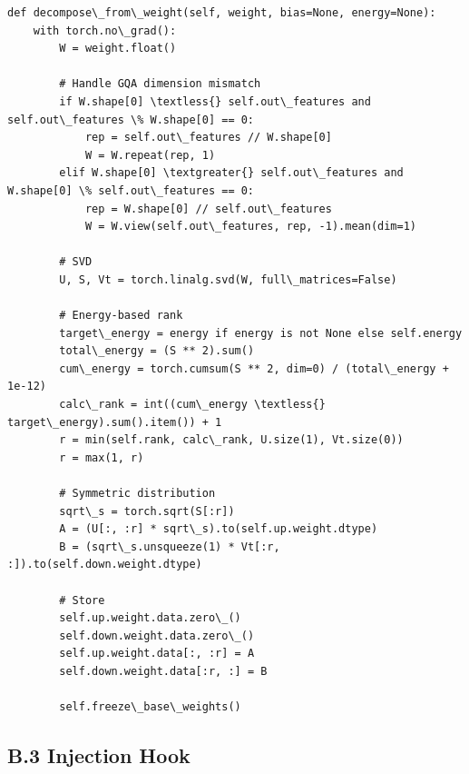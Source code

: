 \begin{lstlisting}
def decompose\_from\_weight(self, weight, bias=None, energy=None):
    with torch.no\_grad():
        W = weight.float()
        
        # Handle GQA dimension mismatch
        if W.shape[0] \textless{} self.out\_features and self.out\_features \% W.shape[0] == 0:
            rep = self.out\_features // W.shape[0]
            W = W.repeat(rep, 1)
        elif W.shape[0] \textgreater{} self.out\_features and W.shape[0] \% self.out\_features == 0:
            rep = W.shape[0] // self.out\_features
            W = W.view(self.out\_features, rep, -1).mean(dim=1)
        
        # SVD
        U, S, Vt = torch.linalg.svd(W, full\_matrices=False)
        
        # Energy-based rank
        target\_energy = energy if energy is not None else self.energy
        total\_energy = (S ** 2).sum()
        cum\_energy = torch.cumsum(S ** 2, dim=0) / (total\_energy + 1e-12)
        calc\_rank = int((cum\_energy \textless{} target\_energy).sum().item()) + 1
        r = min(self.rank, calc\_rank, U.size(1), Vt.size(0))
        r = max(1, r)
        
        # Symmetric distribution
        sqrt\_s = torch.sqrt(S[:r])
        A = (U[:, :r] * sqrt\_s).to(self.up.weight.dtype)
        B = (sqrt\_s.unsqueeze(1) * Vt[:r, :]).to(self.down.weight.dtype)
        
        # Store
        self.up.weight.data.zero\_()
        self.down.weight.data.zero\_()
        self.up.weight.data[:, :r] = A
        self.down.weight.data[:r, :] = B
        
        self.freeze\_base\_weights()
\end{lstlisting}

\subsection{B.3 Injection Hook}


